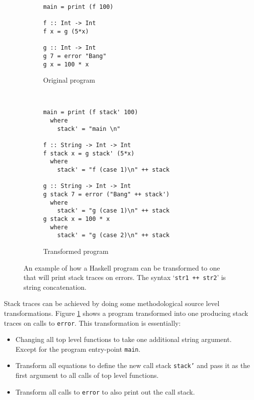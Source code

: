 \begin{figure}
        \begin{subfigure}[t]{0.5\textwidth}
            \begin{verbatim}
main = print (f 100)

f :: Int -> Int
f x = g (5*x)

g :: Int -> Int
g 7 = error "Bang"
g x = 100 * x
            \end{verbatim}
            \caption{Original program}
        \end{subfigure}
        ~ %
        \begin{subfigure}[t]{0.5\textwidth}
          \begin{verbatim}
main = print (f stack' 100)
  where
    stack' = "main \n"

f :: String -> Int -> Int
f stack x = g stack' (5*x)
  where
    stack' = "f (case 1)\n" ++ stack

g :: String -> Int -> Int
g stack 7 = error ("Bang" ++ stack')
  where
    stack' = "g (case 1)\n" ++ stack
g stack x = 100 * x
  where
    stack' = "g (case 2)\n" ++ stack
          \end{verbatim}
          \caption{Transformed program}
        \end{subfigure}
        \caption{An example of how a Haskell program can be transformed to one
          that will print stack traces on errors. The syntax `\texttt{str1 ++
            str2}' is string concatenation.
        }\label{fig:transformation}
\end{figure}

Stack traces can be achieved by doing some methodological source level
transformations. Figure \ref{fig:transformation} shows a program transformed
into one producing stack traces on calls to \texttt{error}. This transformation is essentially:

\begin{itemize}
\itemsep1pt\parskip0pt
\item
  Changing all top level functions to take one additional string
  argument. Except for the program entry-point \texttt{main}.
\item
  Transform all equations to define the new call stack \texttt{stack'} and
  pass it as the first argument to all calls of top level functions.
\item
  Transform all calls to \texttt{error} to also print out the call stack.
\end{itemize}

